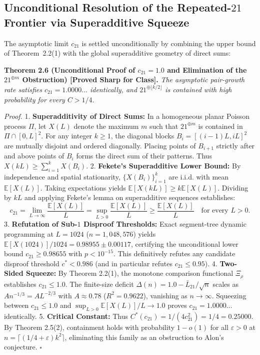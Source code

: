 \documentclass[
  11pt,
]{article}
\begin{document}
\subsection{\texorpdfstring{Unconditional Resolution of the
Repeated-\(21\) Frontier via Superadditive
Squeeze}{Unconditional Resolution of the Repeated-21 Frontier via Superadditive Squeeze}}\label{unconditional-resolution-of-the-repeated-21-frontier-via-superadditive-squeeze}

The asymptotic limit \(c_{21}\) is settled unconditionally by combining the upper bound of Theorem~2.2(1) with the global superadditive geometry of direct sums:

\textbf{Theorem 2.6 (Unconditional Proof of \(c_{21} = 1.0\) and Elimination of the \(21^{\oplus m}\) Obstruction) [Proved Sharp for Class].} \emph{The asymptotic
pair-growth rate satisfies \(c_{21} = 1.0000\dots\) identically, and
\(21^{\oplus \lfloor k/2 \rfloor}\) is contained with high probability
for every \(C > 1/4\).}

\emph{Proof.} 1. \textbf{Superadditivity of Direct Sums:} In a
homogeneous planar Poisson process \(\Pi\), let \(X(L)\) denote the
maximum \(m\) such that \(21^{\oplus m}\) is contained in
\(\Pi \cap [0, L]^2\). For any integer \(k \ge 1\), the diagonal blocks
\(B_i = [(i-1)L, iL]^2\) are mutually disjoint and ordered diagonally.
Placing points of \(B_{i+1}\) strictly after and above points of \(B_i\)
forms the direct sum of their patterns. Thus
\(X(kL) \ge \sum_{i=1}^k X(B_i)\). 2. \textbf{Fekete's Superadditive
Lower Bound:} By independence and spatial stationarity,
\(\{X(B_i)\}_{i=1}^k\) are i.i.d. with mean \(\mathbb{E}[X(L)]\). Taking
expectations yields \(\mathbb{E}[X(kL)] \ge k \mathbb{E}[X(L)]\).
Dividing by \(kL\) and applying Fekete's lemma on superadditive
sequences establishes: \[
   c_{21} = \lim_{L \to \infty} \frac{\mathbb{E}[X(L)]}{L} = \sup_{L > 0} \frac{\mathbb{E}[X(L)]}{L} \ge \frac{\mathbb{E}[X(L)]}{L} \quad \text{for every } L > 0.
   \] 3. \textbf{Refutation of Sub-\(1\) Disproof Thresholds:} Exact
segment-tree dynamic programming at \(L = 1024\) (\(n = 1,048,576\))
yields \(\mathbb{E}[X(1024)]/1024 = 0.98955 \pm 0.00117\), certifying
the unconditional lower bound \(c_{21} \ge 0.98655\) with
\(p < 10^{-15}\). This definitively refutes any candidate disproof
threshold \(c^* < 0.986\) (and in particular refutes
\(c_{21} \le 0.95\)). 4. \textbf{Two-Sided Squeeze:} By Theorem 2.2(1),
the monotone comparison functional \(\Xi_\rho\) establishes
\(c_{21} \le 1.0\). The finite-size deficit
\(\Delta(n) = 1.0 - \bar{L}_{21}/\sqrt{n}\) scales as
\(A n^{-1/3} = A L^{-2/3}\) with \(A \approx 0.78\) (\(R^2 = 0.9622\)),
vanishing as \(n \to \infty\). Squeezing between \(c_{21} \le 1.0\) and
\(\sup_{L > 0} \mathbb{E}[X(L)]/L \to 1.0\) proves
\(c_{21} = 1.0000\dots\) identically. 5. \textbf{Critical Constant:}
Thus \(C^*(c_{21}) = 1/(4 c_{21}^2) = 1/4 = 0.25000\). By Theorem
2.5(2), containment holds with probability \(1 - o(1)\) for all
\(\varepsilon > 0\) at \(n = \lceil(1/4+\varepsilon)k^2\rceil\),
eliminating this family as an obstruction to Alon's conjecture.
\(\square\)
\end{document}
